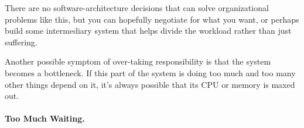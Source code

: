 There are no software-architecture decisions that can solve organizational problems like this, but you can hopefully negotiate for what you want, or perhaps build some intermediary system that helps divide the workload rather than just suffering.

Another possible symptom of over-taking responsibility is that the system becomes a bottleneck. If this part of the system is doing too much and too many other things depend on it, it's always possible that its CPU or memory is maxed out. 

\paragraph{Too Much Waiting.} 







